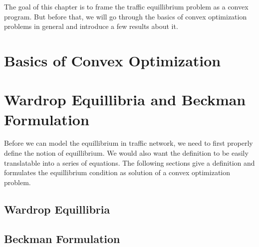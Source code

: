 The goal of this chapter is to  frame the traffic equillibrium problem
as a convex program. But before that, we will go through the basics of
convex optimization problems in general and introduce a few
results about it.

\section{Basics of Convex Optimization}


\section{Wardrop Equillibria and Beckman Formulation}
	Before we can model the equillibrium in traffic network, we need
	to first properly define the notion of equillibrium. We would also
	want the definition to be easily translatable into a series of
	equations. The following sections give a definition and
	formulates the equillibrium condition as solution of a
	convex optimization problem.

	\subsection{Wardrop Equillibria}
	
	

	\subsection{Beckman Formulation}
	
